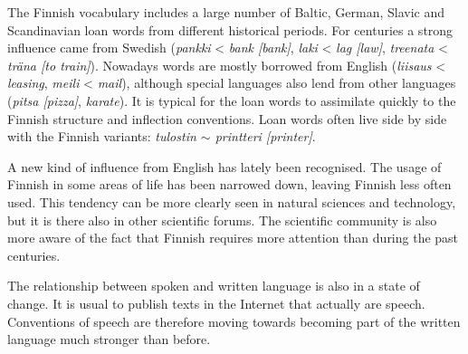 \documentclass{../../metanetpaper}
\begin{document}
\begin{Parallel}[c]{79mm}{78mm}
{The Finnish vocabulary includes a large number of Baltic, German, Slavic and
Scandinavian loan words from different historical periods. For centuries a
strong influence came from Swedish
 ({\foreignlanguage{finnish}{\textit{pankki}}} < \textit{bank [bank]},
  {\foreignlanguage{finnish}{\textit{laki}}} < \textit{lag [law]},
  {\foreignlanguage{finnish}{\textit{treenata}}} < \textit{träna [to train]}).
Nowadays words are mostly borrowed from English
 ({\foreignlanguage{finnish}{\textit{liisaus}}} < \textit{leasing},
  {\foreignlanguage{finnish}{\textit{meili}}} < \textit{mail}),
although special languages also lend from
other languages
 (\textit{\foreignlanguage{finnish}{\textit{pitsa}} [pizza]},
  \textit{\foreignlanguage{finnish}{\textit{karate}}}).
It is typical for the loan words to
assimilate quickly to the Finnish structure and inflection conventions. Loan
words often live side by side with the Finnish variants:
\textit{\foreignlanguage{finnish}{\textit{tulostin}} $\sim$
        \foreignlanguage{finnish}{\textit{printteri}} [printer]}.

A new kind of influence from English has lately been recognised. The usage of
Finnish in some areas of life has been narrowed down, leaving Finnish less
often used. This tendency can be more clearly seen in natural sciences and
technology, but it is there also in other scientific forums. The scientific
community is also more aware of the fact that Finnish requires more attention
than during the past centuries.

The relationship between spoken and written language is also in a state of
change. It is usual to publish texts in the Internet that actually are speech.
Conventions of speech are therefore moving towards becoming part of the written
language much stronger than before.
}

\ParallelPar


\end{Parallel}
\end{document}
